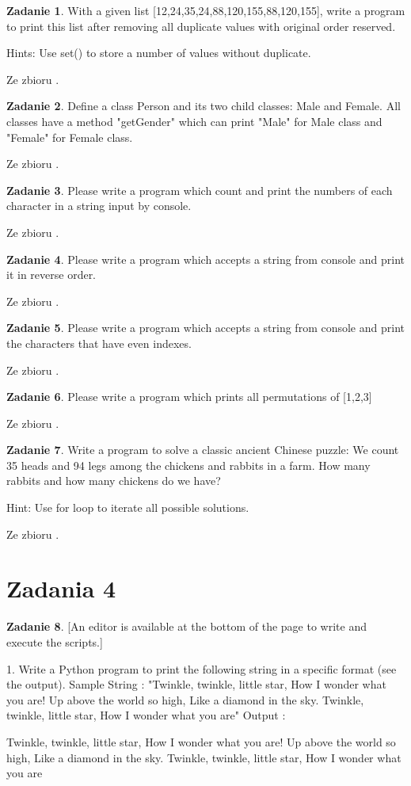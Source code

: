\documentclass[11pt]{article}
\theoremstyle{definition}
\newtheorem{zadanie}{Zadanie}
\newcommand{\fromA}{\small Ze zbioru \cite{python100}.}
\begin{document}
\begin{zadanie}
With a given list [12,24,35,24,88,120,155,88,120,155], write a program to print this list after removing all duplicate values with original order reserved.

Hints:
Use set() to store a number of values without duplicate.

\fromA
\end{zadanie}
\begin{zadanie}
Define a class Person and its two child classes: Male and Female. All classes have a method "getGender" which can print "Male" for Male class and "Female" for Female class.

\fromA
\end{zadanie}
\begin{zadanie}
Please write a program which count and print the numbers of each character in a string input by console.

\fromA
\end{zadanie}
\begin{zadanie}
Please write a program which accepts a string from console and print it in reverse order.

\fromA
\end{zadanie}
\begin{zadanie}
Please write a program which accepts a string from console and print the characters that have even indexes.

\fromA
\end{zadanie}
\begin{zadanie}
Please write a program which prints all permutations of [1,2,3]

\fromA
\end{zadanie}
\begin{zadanie}
Write a program to solve a classic ancient Chinese puzzle: 
We count 35 heads and 94 legs among the chickens and rabbits in a farm. How many rabbits and how many chickens do we have?

Hint:
Use for loop to iterate all possible solutions.

\fromA
\end{zadanie}

\section{Zadania 4}

\begin{zadanie}

[An editor is available at the bottom of the page to write and execute the scripts.]

1. Write a Python program to print the following string in a specific format (see the output). 
Sample String : "Twinkle, twinkle, little star, How I wonder what you are! Up above the world so high, Like a diamond in the sky. Twinkle, twinkle, little star, How I wonder what you are" Output :

Twinkle, twinkle, little star,
	How I wonder what you are! 
		Up above the world so high,   		
		Like a diamond in the sky. 
Twinkle, twinkle, little star, 
	How I wonder what you are


\end{zadanie}
\end{document}
